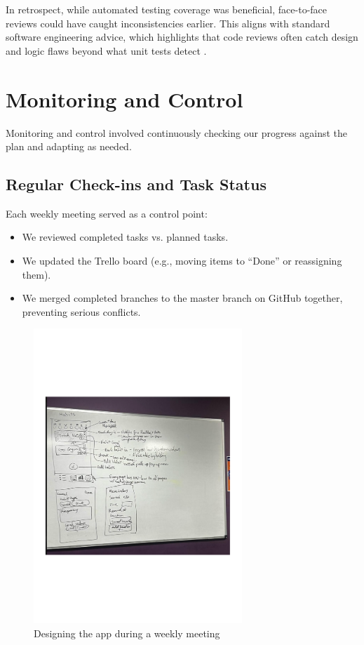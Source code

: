 In retrospect, while automated testing coverage was beneficial, face-to-face reviews could have caught inconsistencies earlier. This aligns with standard software engineering advice, which highlights that code reviews often catch design and logic flaws beyond what unit tests detect \cite{fowler2018refactoring}.

\section{Monitoring and Control}
Monitoring and control involved continuously checking our progress against the plan and adapting as needed.

\subsection{Regular Check-ins and Task Status}
Each weekly meeting served as a control point:
\begin{itemize}
    \item We reviewed completed tasks vs. planned tasks.
    \item We updated the Trello board (e.g., moving items to “Done” or reassigning them).
    \item We merged completed branches to the master branch on GitHub together, preventing serious conflicts.
\end{itemize}

\begin{figure}[H]
    \centering
    \includegraphics[width=0.7\textwidth]{resources/board.pdf}
    \caption{Designing the app during a weekly meeting}
    \label{fig:whiteboard_meeting}
\end{figure}


